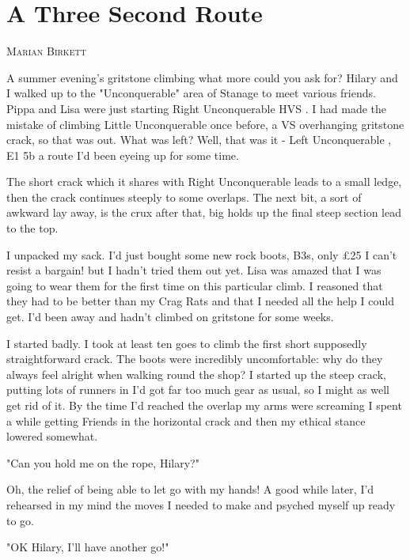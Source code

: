 \documentclass[a5paper,openany,font 10pt]{scrbook}
\makeatletter
\newcommand{\chapterauthor}[1]{%
{\parindent0pt\vspace*{-5pt}%
\linespread{1.1}\large\scshape#1%
\par\nobreak\vspace*{35pt}}
\@afterheading%
}
\makeatother
\begin{document}
\chapter{A Three Second Route}
\label{sec:org5aa6145}
\chapterauthor{Marian Birkett}

A summer evening's gritstone climbing   what more could you
ask for? Hilary and I walked up to the "Unconquerable" area of
Stanage to meet various friends. Pippa and Lisa were just
starting  Right Unconquerable   HVS . I had made the mistake of
climbing  Little Unconquerable  once before, a VS overhanging
gritstone crack, so that was out. What was left? Well, that was
it -  Left Unconquerable , E1 5b   a route I'd been eyeing up for
some time.

The short crack which it shares with  Right Unconquerable
leads to a small ledge, then the crack continues steeply to some
overlaps. The next bit, a sort of awkward lay away, is the crux
after that, big holds up the final steep section lead to the top.

I unpacked my sack. I'd just bought some new rock boots,
B3s, only  £25  I can't resist a bargain!  but I hadn't tried them
out yet. Lisa was amazed that I was going to wear them for the
first time on this particular climb. I reasoned that they had to
be better than my Crag Rats and that I needed all the help I
could get. I'd been away and hadn't climbed on gritstone for some
weeks.

I started badly. I took at least ten goes to climb the first
short  supposedly straightforward  crack. The boots were
incredibly uncomfortable: why do they always feel alright when
walking round the shop? I started up the steep crack, putting
lots of runners in   I'd got far too much gear as usual, so I
might as well get rid of it. By the time I'd reached the overlap
my arms were screaming   I spent a while getting Friends in the
horizontal crack and then my ethical stance lowered somewhat.

"Can you hold me on the rope, Hilary?"

Oh, the relief of being able to let go with my hands! A good
while later, I'd rehearsed in my mind the moves I needed to make
and psyched myself up ready to go.

"OK Hilary, I'll have another go!"
\end{document}
